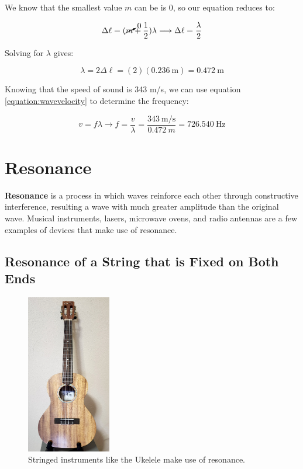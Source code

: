 \begin{mdframed}[backgroundcolor=blue!10!white]
		We know that the smallest value $m$ can be is 0, so our equation reduces to:
				
		\begin{equation*}
		\Delta \ell = (\cancelto{0}{m}+\frac{1}{2}) \lambda \longrightarrow \Delta \ell = \frac{\lambda}{2}
		\end{equation*}
		
		


		Solving for $\lambda$ gives:
		
		
		\begin{equation*}
		\lambda = 2 \Delta \ell = (2)(\SI{0.236}{\m}) = \SI{0.472}{\m}
		\end{equation*}
		
	
		Knowing that the speed of sound is 343 m/s, we can use equation \ref{equation:wavevelocity} to determine the frequency:
		
		\begin{equation*}
		v = f \lambda \longrightarrow f = \frac{v}{\lambda} = \frac{\SI[per-mode = symbol]{343}{\m\per\s}}{\SI{0.472}{m}} = \boxed{\SI{726.540}{\Hz}} 
		\end{equation*}
		

		 
	
		
	\end{mdframed}
	
	
	\section{Resonance}
	\textbf{Resonance} is a process in which waves reinforce each other through constructive interference, resulting a wave with much greater amplitude than the original wave.   Musical instruments, lasers, microwave ovens, and radio antennas are a few examples of devices that make use of resonance. 
	
		\subsection{Resonance of a String that is Fixed on Both Ends}
		
		\begin{figure}[h!]
			\begin{center}
			\includegraphics[height=2.75in]{Chapters/Ch10-Waves/ukelele.jpg}			
			\caption{Stringed instruments like the Ukelele make use of resonance.}
		\end{center}
\end{figure}
	
